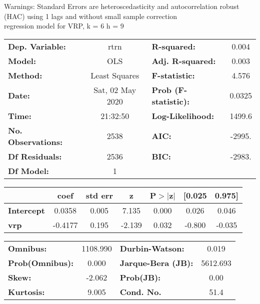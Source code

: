 Warnings: \newline
 [1] Standard Errors are heteroscedasticity and autocorrelation robust (HAC) using 1 lags and without small sample correction\\ 

regression model for VRP, k = 6 h = 9\begin{center}
\begin{tabular}{lclc}
\toprule
\textbf{Dep. Variable:}    &       rtrn       & \textbf{  R-squared:         } &     0.004   \\
\textbf{Model:}            &       OLS        & \textbf{  Adj. R-squared:    } &     0.003   \\
\textbf{Method:}           &  Least Squares   & \textbf{  F-statistic:       } &     4.576   \\
\textbf{Date:}             & Sat, 02 May 2020 & \textbf{  Prob (F-statistic):} &   0.0325    \\
\textbf{Time:}             &     21:32:50     & \textbf{  Log-Likelihood:    } &    1499.6   \\
\textbf{No. Observations:} &        2538      & \textbf{  AIC:               } &    -2995.   \\
\textbf{Df Residuals:}     &        2536      & \textbf{  BIC:               } &    -2983.   \\
\textbf{Df Model:}         &           1      & \textbf{                     } &             \\
\bottomrule
\end{tabular}
\begin{tabular}{lcccccc}
                   & \textbf{coef} & \textbf{std err} & \textbf{z} & \textbf{P$> |$z$|$} & \textbf{[0.025} & \textbf{0.975]}  \\
\midrule
\textbf{Intercept} &       0.0358  &        0.005     &     7.135  &         0.000        &        0.026    &        0.046     \\
\textbf{vrp}       &      -0.4177  &        0.195     &    -2.139  &         0.032        &       -0.800    &       -0.035     \\
\bottomrule
\end{tabular}
\begin{tabular}{lclc}
\textbf{Omnibus:}       & 1108.990 & \textbf{  Durbin-Watson:     } &    0.019  \\
\textbf{Prob(Omnibus):} &   0.000  & \textbf{  Jarque-Bera (JB):  } & 5612.693  \\
\textbf{Skew:}          &  -2.062  & \textbf{  Prob(JB):          } &     0.00  \\
\textbf{Kurtosis:}      &   9.005  & \textbf{  Cond. No.          } &     51.4  \\
\bottomrule
\end{tabular}
\end{center}

